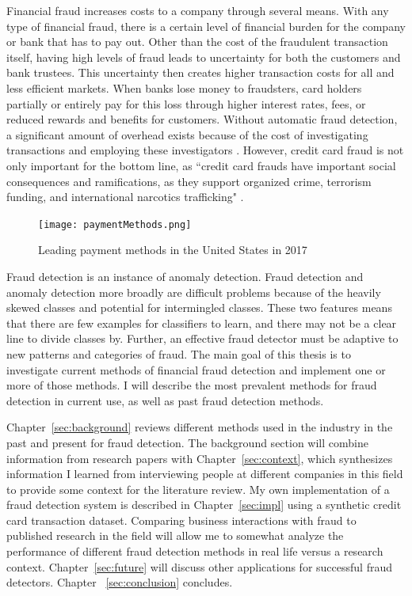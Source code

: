 \documentclass[midd]{thesis}
\begin{document}
Financial fraud increases costs to a company through several means. With any type of financial fraud, there is a certain level of financial burden for the company or bank that has to pay out. Other than the cost of the fraudulent transaction itself, having high levels of fraud leads to uncertainty for both the customers and bank trustees. This uncertainty then creates higher transaction costs for all and less efficient markets. When banks lose money to fraudsters, card holders partially or entirely pay for this loss through higher interest rates, fees, or reduced rewards and benefits for customers. Without automatic fraud detection, a significant amount of overhead exists because of the cost of investigating transactions and employing these investigators \cite{Chan}. However, credit card fraud is not only important for the bottom line, as ``credit card frauds have important social consequences and ramifications, as they support organized crime, terrorism funding, and international narcotics trafficking" \cite{Zanin2018}.

\begin{figure}
  \texttt{[image: paymentMethods.png]}
  \caption{Leading payment methods in the United States in 2017 \cite{paymentMethods}}
  \label{fig:paymentMethods}
\end{figure}

Fraud detection is an instance of anomaly detection. Fraud detection and anomaly detection more broadly are difficult problems because of the heavily skewed classes and potential for intermingled classes. These two features means that there are few examples for classifiers to learn, and there may not be a clear line to divide classes by. Further, an effective fraud detector must be adaptive to new patterns and categories of fraud. The main goal of this thesis is to investigate current methods of financial fraud detection and implement one or more of those methods. I will describe the most prevalent methods for fraud detection in current use, as well as past fraud detection methods.

Chapter~\ref{sec:background} reviews different methods used in the industry in the past and present for fraud detection. The background section will combine information from research papers with Chapter~\ref{sec:context}, which synthesizes information I learned from interviewing people at different companies in this field to provide some context for the literature review. My own implementation of a fraud detection system is described in Chapter~\ref{sec:impl} using a synthetic credit card transaction dataset. Comparing business interactions with fraud to published research in the field will allow me to somewhat analyze the performance of different fraud detection methods in real life versus a research context. Chapter~\ref{sec:future} will discuss other applications for successful fraud detectors. Chapter ~\ref{sec:conclusion} concludes.
\end{document}
